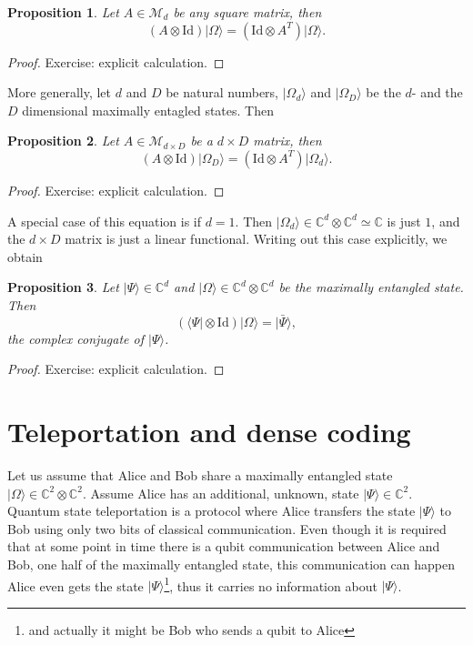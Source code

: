 \documentclass{article}
\newtheorem{proposition}{Proposition}
\theoremstyle{definition}
\newcommand{\id}{\mathrm{Id}}
\newcommand{\ket}[1]{\vert #1 \rangle}
\newcommand{\bra}[1]{\langle #1 \vert}
\begin{document}
\begin{proposition}\label{prop:max_ent_pull_through}
  Let $A\in\mathcal{M}_d$ be any square matrix, then 
  \begin{equation*}
     (A \otimes \id) \ket{\Omega} = (\id\otimes A^T) \ket{\Omega}.
  \end{equation*}
\end{proposition}
\begin{proof}
   Exercise: explicit calculation.
\end{proof}
More generally, let $d$ and $D$ be natural numbers, $\ket{\Omega_d}$ and $\ket{\Omega_D}$ be the $d$- and the $D$ dimensional maximally entagled states. Then
\begin{proposition}
  Let $A\in\mathcal{M}_{d\times D}$ be a $d\times D$ matrix, then 
  \begin{equation*}
    (A \otimes \id) \ket{\Omega_D} = (\id\otimes A^T) \ket{\Omega_d}.
  \end{equation*}
\end{proposition}
\begin{proof}
  Exercise: explicit calculation.
\end{proof}
A special case of this equation is if $d=1$. Then $\ket{\Omega_d} \in \mathbb{C}^d\otimes \mathbb{C}^d \simeq \mathbb{C}$ is just $1$, and the $d\times D$ matrix is just a linear functional. Writing out this case explicitly, we obtain 
\begin{proposition}\label{prop:max_ent_pull_through_lin_fcn}
  Let $\ket{\Psi}\in\mathbb{C}^{d}$ and $\ket{\Omega}\in \mathbb{C}^d \otimes \mathbb{C}^d$ be the maximally entangled state. Then 
  \begin{equation*}
    (\bra{\Psi} \otimes \id) \ket{\Omega} = \ket{\bar{\Psi}},
  \end{equation*}
  the complex conjugate of $\ket{\Psi}$.
\end{proposition}
\begin{proof}
  Exercise: explicit calculation.
\end{proof}


\section{Teleportation and dense coding}

Let us assume that Alice and Bob share a maximally entangled state $\ket{\Omega}\in \mathbb{C}^2 \otimes \mathbb{C}^2$. Assume Alice has an additional, unknown, state $\ket{\Psi}\in\mathbb{C}^2$. Quantum state teleportation is a protocol where Alice transfers the state $\ket{\Psi}$ to Bob using only two bits of classical communication. Even though it is required that at some point in time there is a qubit communication between Alice and Bob, one half of the maximally entangled state, this communication can happen Alice even gets the state $\ket{\Psi}$\footnote{and actually it might be Bob who sends a qubit to Alice}, thus it carries no information about $\ket{\Psi}$. 
\end{document}
